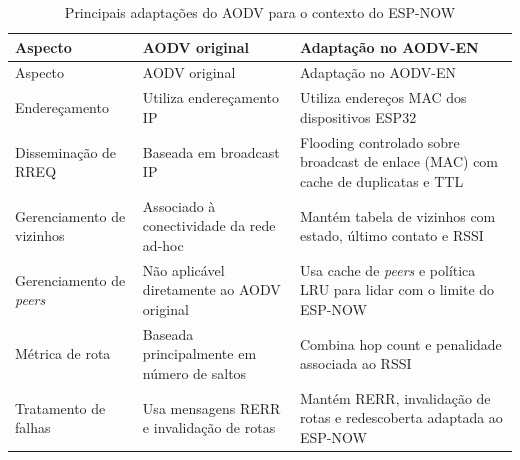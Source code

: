 {\def\LTcaptype{quadro}
\begin{longtable}[]{@{}
  >{\raggedright\arraybackslash}p{}
  >{\raggedright\arraybackslash}p{}
  >{\raggedright\arraybackslash}p{}@{}}
\caption{Principais adaptações do AODV para o contexto do ESP-NOW}\label{quadro:adaptacoes}\\
\toprule\noalign{}
\begin{minipage}[b]{\linewidth}\raggedright
Aspecto
\end{minipage} & \begin{minipage}[b]{\linewidth}\raggedright
AODV original
\end{minipage} & \begin{minipage}[b]{\linewidth}\raggedright
Adaptação no AODV-EN
\end{minipage} \\
\midrule\noalign{}
\endfirsthead
\toprule\noalign{}
\begin{minipage}[b]{\linewidth}\raggedright
Aspecto
\end{minipage} & \begin{minipage}[b]{\linewidth}\raggedright
AODV original
\end{minipage} & \begin{minipage}[b]{\linewidth}\raggedright
Adaptação no AODV-EN
\end{minipage} \\
\midrule\noalign{}
\endhead
\bottomrule\noalign{}
\endlastfoot
Endereçamento & Utiliza endereçamento IP & Utiliza endereços MAC dos
dispositivos ESP32 \\
Disseminação de RREQ & Baseada em broadcast IP & Flooding controlado
sobre broadcast de enlace (MAC) com cache de duplicatas e TTL \\
Gerenciamento de vizinhos & Associado à conectividade da rede ad-hoc &
Mantém tabela de vizinhos com estado, último contato e RSSI \\
Gerenciamento de \emph{peers} & Não aplicável diretamente ao AODV original &
Usa cache de \emph{peers} e política LRU para lidar com o limite do ESP-NOW \\
Métrica de rota & Baseada principalmente em número de saltos & Combina
hop count e penalidade associada ao RSSI \\
Tratamento de falhas & Usa mensagens RERR e invalidação de rotas &
Mantém RERR, invalidação de rotas e redescoberta adaptada ao ESP-NOW \\
\end{longtable}
}

